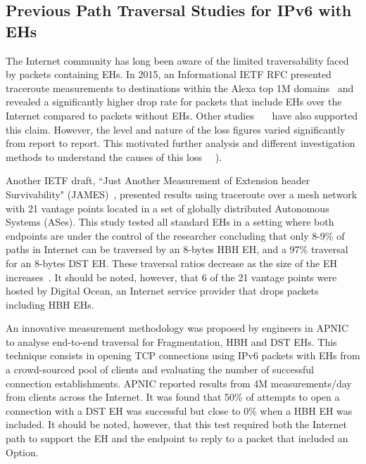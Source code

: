 \documentclass[conference]{IEEEtran}
\begin{document}
\subsection{Previous Path Traversal Studies for IPv6 with EHs}

\label{sec:motivation}

The Internet community has long been aware of the limited traversability faced
by packets containing EHs.  In 2015, an Informational IETF RFC presented
traceroute measurements to destinations within the Alexa top 1M
domains~\cite{RFC7872} and revealed a significantly higher drop rate for
packets that include EHs over the Internet compared to packets without EHs.
Other studies~\cite{james}~\cite{nalini-iepg114}~\cite{apnic} have also
supported this claim.  However, the level and nature of the loss figures varied
significantly from report to report. This motivated further analysis and
different investigation methods to understand the causes of this loss
~\cite{james}~\cite{elkins-v6ops-eh-deepdive-fw-01}).  

Another IETF draft, ``Just Another Measurement of Extension header
Survivability" (JAMES)~\cite{james}, presented results using traceroute over a
mesh network with 21 vantage points located in a set of globally distributed
Autonomous Systems (ASes). This study tested all standard EHs in a setting
where both endpoints are under the control of the researcher concluding that
only 8-9\% of paths in Internet can be traversed by an 8-bytes HBH EH, and a
97\% traversal for an 8-bytes DST EH.  These traversal ratios decrease as the
size of the EH increases~\cite{james-imc}. It should be noted, however, that 6
of the 21 vantage points were hosted by Digital Ocean\texttrademark, an
Internet service provider that drops packets including HBH EHs.

An innovative measurement methodology was proposed by engineers in
APNIC~\cite{apnic} to analyse end-to-end traversal for Fragmentation, HBH and
DST EHs.  This technique consists in opening TCP connections using IPv6 packets
with EHs from a crowd-sourced pool of clients and evaluating the number of
successful connection establishments.  APNIC reported results from 4M
measurements/day from clients across the Internet.  It was found that 50\%  of
attempts to open a connection with a DST EH was successful but close to 0\%
when a HBH EH was included.  It should be noted, however, that this test
required both the Internet path to support the EH and the endpoint to reply to
a packet that included an Option. 
\end{document}
